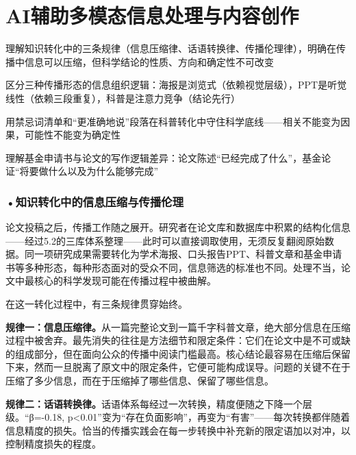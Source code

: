 \section{AI辅助多模态信息处理与内容创作}
\label{sec:5.7}

\begin{sectionkeypoints}
\item 理解知识转化中的三条规律（信息压缩律、话语转换律、传播伦理律），明确在传播中信息可以压缩，但科学结论的性质、方向和确定性不可改变
\item 区分三种传播形态的信息组织逻辑：海报是浏览式（依赖视觉层级），PPT是听觉线性（依赖三段重复），科普是注意力竞争（结论先行）
\item 用禁忌词清单和``更准确地说''段落在科普转化中守住科学底线——相关不能变为因果，可能性不能变为确定性
\item 理解基金申请书与论文的写作逻辑差异：论文陈述``已经完成了什么''，基金论证``将要做什么以及为什么能够完成''
\end{sectionkeypoints}

\subsubsection*{\textbf{•知识转化中的信息压缩与传播伦理}}

论文投稿之后，传播工作随之展开。研究者在论文库和数据库中积累的结构化信息——经过5.2的三库体系整理——此时可以直接调取使用，无须反复翻阅原始数据。同一项研究成果需要转化为学术海报、口头报告PPT、科普文章和基金申请书等多种形态，每种形态面对的受众不同，信息筛选的标准也不同。处理不当，论文中最核心的科学发现可能在传播过程中被曲解。

在这一转化过程中，有三条规律贯穿始终。

\textbf{规律一：信息压缩律。}从一篇完整论文到一篇千字科普文章，绝大部分信息在压缩过程中被舍弃。最先消失的往往是方法细节和限定条件：它们在论文中是不可或缺的组成部分，但在面向公众的传播中阅读门槛最高。核心结论最容易在压缩后保留下来，然而一旦脱离了原文中的限定条件，它便可能构成误导。问题的关键不在于压缩了多少信息，而在于压缩掉了哪些信息、保留了哪些信息。

\textbf{规律二：话语转换律。}话语体系每经过一次转换，精度便随之下降一个层级。``β=-0.18, p<0.01''变为``存在负面影响''，再变为``有害''——每次转换都伴随着信息精度的损失。恰当的传播实践会在每一步转换中补充新的限定语加以对冲，以控制精度损失的程度。

